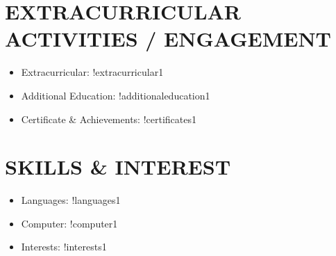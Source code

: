 \documentclass[a4paper,8pt]{article}
\begin{document}
    \section{EXTRACURRICULAR ACTIVITIES / ENGAGEMENT}
    \begin{itemize}[label={\large\textbullet}, left=0pt, itemsep=0.5ex, parsep=0.5ex]
        \item Extracurricular: !extracurricular1
        \item Additional Education: !additionaleducation1
        \item Certificate \& Achievements: !certificates1
    \end{itemize}
    
    \section{SKILLS \& INTEREST}
    \begin{itemize}[label={\large\textbullet}, left=0pt, itemsep=0.5ex, parsep=0.5ex]
        \item Languages: !languages1
        \item Computer: !computer1
        \item Interests: !interests1
    \end{itemize}
    
    
\end{document}
